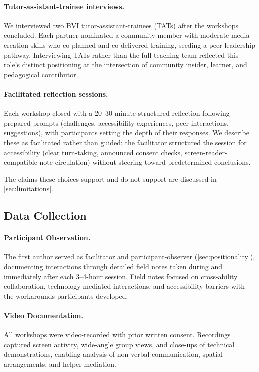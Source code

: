 \paragraph{Tutor-assistant-trainee interviews.}
We interviewed two BVI tutor-assistant-trainees (TATs) after the workshops concluded. Each partner nominated a community member with moderate media-creation skills who co-planned and co-delivered training, seeding a peer-leadership pathway. Interviewing TATs rather than the full teaching team reflected this role's distinct positioning at the intersection of community insider, learner, and pedagogical contributor.

\paragraph{Facilitated reflection sessions.}
Each workshop closed with a 20--30-minute structured reflection following prepared prompts (challenges, accessibility experiences, peer interactions, suggestions), with participants setting the depth of their responses. We describe these as facilitated rather than guided: the facilitator structured the session for accessibility (clear turn-taking, announced consent checks, screen-reader-compatible note circulation) without steering toward predetermined conclusions.

The claims these choices support and do not support are discussed in \autoref{sec:limitations}.

\subsection{Data Collection}

\paragraph{Participant Observation.}
The first author served as facilitator and participant-observer (\autoref{sec:positionality}), documenting interactions through detailed field notes taken during and immediately after each 3--4-hour session. Field notes focused on cross-ability collaboration, technology-mediated interactions, and accessibility barriers with the workarounds participants developed.

\paragraph{Video Documentation.}
All workshops were video-recorded with prior written consent. Recordings captured screen activity, wide-angle group views, and close-ups of technical demonstrations, enabling analysis of non-verbal communication, spatial arrangements, and helper mediation.

